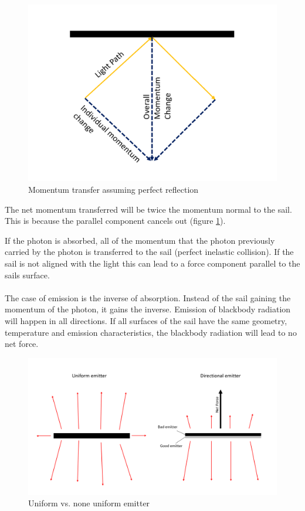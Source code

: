 \documentclass[14pt]{article}
\begin{document}
\begin{figure}[H]
  \centering
  \includegraphics[width=14cm]{./resources/solar_sail_momentum.png}
  \caption{Momentum transfer assuming perfect reflection}
  \label{fig:sail_momentum_reflected}
\end{figure}

The net momentum transferred will be twice the momentum normal to the sail.
This is because the parallel component cancels out (figure \ref{fig:sail_momentum_reflected}).

If the photon is absorbed, all of the momentum that the photon previously carried by the photon is transferred to
the sail (perfect inelastic collision). If the sail is not aligned with the light this can lead to a force component
parallel to the sails surface.\\
\\
The case of emission is the inverse of absorption. Instead of the sail gaining the momentum of the photon, it gains the inverse. 
Emission of blackbody radiation will happen in all directions. If all surfaces of the sail have the same geometry,
temperature and emission characteristics, the blackbody radiation will lead to no net force.

\begin{figure}[H]
  \centering
  \includegraphics[width=14cm]{./resources/dicrectional_emitter.png}
  \caption{Uniform vs. none uniform emitter}
  \label{fig:dicrectional_emitter}
\end{figure}
\end{document}
